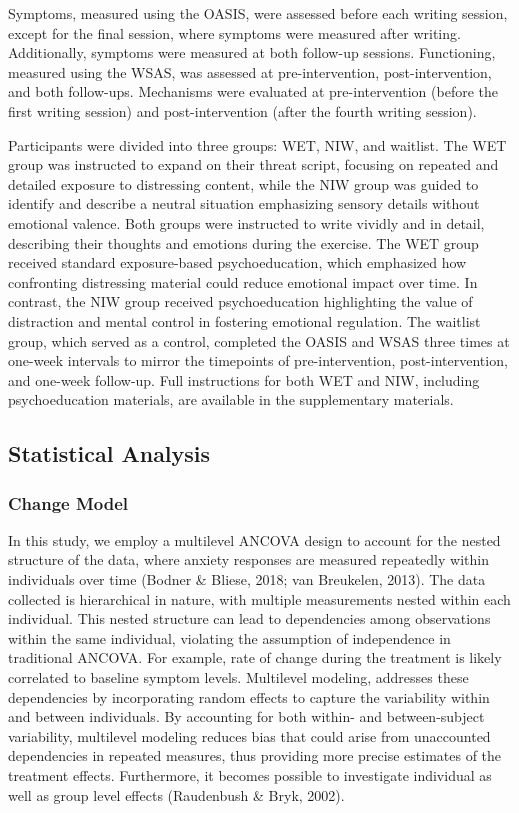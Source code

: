 \documentclass[
  man,floatsintext]{apa7}
\begin{document}
Symptoms, measured using the OASIS, were assessed before each writing session, except for the final session, where symptoms were measured after writing.
Additionally, symptoms were measured at both follow-up sessions.
Functioning, measured using the WSAS, was assessed at pre-intervention, post-intervention, and both follow-ups.
Mechanisms were evaluated at pre-intervention (before the first writing session) and post-intervention (after the fourth writing session).

Participants were divided into three groups: WET, NIW, and waitlist.
The WET group was instructed to expand on their threat script, focusing on repeated and detailed exposure to distressing content, while the NIW group was guided to identify and describe a neutral situation emphasizing sensory details without emotional valence.
Both groups were instructed to write vividly and in detail, describing their thoughts and emotions during the exercise.
The WET group received standard exposure-based psychoeducation, which emphasized how confronting distressing material could reduce emotional impact over time.
In contrast, the NIW group received psychoeducation highlighting the value of distraction and mental control in fostering emotional regulation.
The waitlist group, which served as a control, completed the OASIS and WSAS three times at one-week intervals to mirror the timepoints of pre-intervention, post-intervention, and one-week follow-up.
Full instructions for both WET and NIW, including psychoeducation materials, are available in the supplementary materials.

\subsection{Statistical Analysis}\label{statistical-analysis}

\subsubsection{Change Model}\label{change-model}

In this study, we employ a multilevel ANCOVA design to account for the nested structure of the data, where anxiety responses are measured repeatedly within individuals over time (Bodner \& Bliese, 2018; van Breukelen, 2013).
The data collected is hierarchical in nature, with multiple measurements nested within each individual.
This nested structure can lead to dependencies among observations within the same individual, violating the assumption of independence in traditional ANCOVA.
For example, rate of change during the treatment is likely correlated to baseline symptom levels.
Multilevel modeling, addresses these dependencies by incorporating random effects to capture the variability within and between individuals.
By accounting for both within- and between-subject variability, multilevel modeling reduces bias that could arise from unaccounted dependencies in repeated measures, thus providing more precise estimates of the treatment effects.
Furthermore, it becomes possible to investigate individual as well as group level effects (Raudenbush \& Bryk, 2002).
\end{document}

